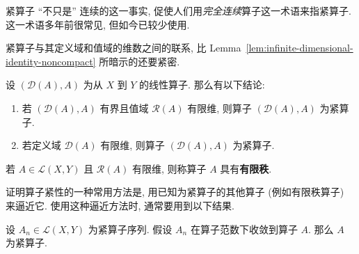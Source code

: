 紧算子 ``不只是'' 连续的这一事实, 促使人们用\emph{完全连续}算子这一术语来指紧算子. 这一术语多年前很常见, 但如今已较少使用.

紧算子与其定义域和值域的维数之间的联系, 比 Lemma~\ref{lem:infinite-dimensional-identity-noncompact} 所暗示的还要紧密.

\begin{Theorem}
\label{thm:finite-dimensional-domain-range-compactness}
设 $(\mathcal{D}(A),A)$ 为从 $X$ 到 $Y$ 的线性算子. 那么有以下结论:\begin{enumerate}\item 若 $(\mathcal{D}(A),A)$ 有界且值域 $\mathcal{R}(A)$ 有限维, 则算子 $(\mathcal{D}(A),A)$ 为紧算子.\item 若定义域 $\mathcal{D}(A)$ 有限维, 则算子 $(\mathcal{D}(A),A)$ 为紧算子.\end{enumerate}
\end{Theorem}

\begingroup
{}
\renewcommand{\endProof}{\par\nobreak\hfill$\blacksquare$\par\vspace{0.1cm}}
\endgroup

\begin{Definition}
\label{def:finite-rank-operator}
若 $A\in\mathcal{L}(X,Y)$ 且 $\mathcal{R}(A)$ 有限维, 则称算子 $A$ 具有\textbf{有限秩}.
\end{Definition}

证明算子紧性的一种常用方法是, 用已知为紧算子的其他算子 (例如有限秩算子) 来逼近它. 使用这种逼近方法时, 通常要用到以下结果.

\begin{Theorem}
\label{thm:norm-limit-of-compact-operators}
设 $A_n\in\mathcal{L}(X,Y)$ 为紧算子序列. 假设 $A_n$ 在算子范数下收敛到算子 $A$. 那么 $A$ 为紧算子.
\end{Theorem}


